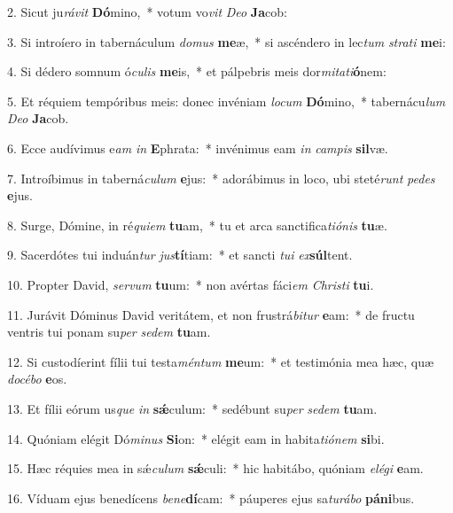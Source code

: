 2. Sicut ju\textit{rá}\textit{vit} \textbf{Dó}mino,~*  votum vo\textit{vit} \textit{De}\textit{o} \textbf{Ja}cob:\

3. Si introíero in tabernáculum \textit{do}\textit{mus} \textbf{me}æ,~*  si ascéndero in lec\textit{tum} \textit{stra}\textit{ti} \textbf{me}i:\

4. Si dédero somnum ó\textit{cu}\textit{lis} \textbf{me}is,~*  et pálpebris meis dor\textit{mi}\textit{ta}\textit{ti}\textbf{ó}nem:\

5. Et réquiem tempóribus meis: donec invéniam \textit{lo}\textit{cum} \textbf{Dó}mino,~*  tabernácu\textit{lum} \textit{De}\textit{o} \textbf{Ja}cob.\

6. Ecce audívimus e\textit{am} \textit{in} \textbf{E}phrata:~*  invénimus eam \textit{in} \textit{cam}\textit{pis} \textbf{sil}væ.\

7. Introíbimus in taberná\textit{cu}\textit{lum} \textbf{e}jus:~*  adorábimus in loco, ubi steté\textit{runt} \textit{pe}\textit{des} \textbf{e}jus.\

8. Surge, Dómine, in ré\textit{qui}\textit{em} \textbf{tu}am,~*  tu et arca sanctifica\textit{ti}\textit{ó}\textit{nis} \textbf{tu}æ.\

9. Sacerdótes tui induán\textit{tur} \textit{jus}\textbf{tí}tiam:~*  et sancti \textit{tu}\textit{i} \textit{ex}\textbf{súl}tent.\

10. Propter David, \textit{ser}\textit{vum} \textbf{tu}um:~*  non avértas fáci\textit{em} \textit{Chris}\textit{ti} \textbf{tu}i.\

11. Jurávit Dóminus David veritátem, et non frustrá\textit{bi}\textit{tur} \textbf{e}am:~*  de fructu ventris tui ponam su\textit{per} \textit{se}\textit{dem} \textbf{tu}am.\

12. Si custodíerint fílii tui testa\textit{mén}\textit{tum} \textbf{me}um:~*  et testimónia mea hæc, quæ \textit{do}\textit{cé}\textit{bo} \textbf{e}os.\

13. Et fílii eórum us\textit{que} \textit{in} \textbf{sǽ}culum:~*  sedébunt su\textit{per} \textit{se}\textit{dem} \textbf{tu}am.\

14. Quóniam elégit Dó\textit{mi}\textit{nus} \textbf{Si}on:~*  elégit eam in habita\textit{ti}\textit{ó}\textit{nem} \textbf{si}bi.\

15. Hæc réquies mea in sǽ\textit{cu}\textit{lum} \textbf{sǽ}culi:~*  hic habitábo, quóniam \textit{e}\textit{lé}\textit{gi} \textbf{e}am.\

16. Víduam ejus benedícens \textit{be}\textit{ne}\textbf{dí}cam:~*  páuperes ejus sa\textit{tu}\textit{rá}\textit{bo} \textbf{pá}\textbf{ni}bus.\

